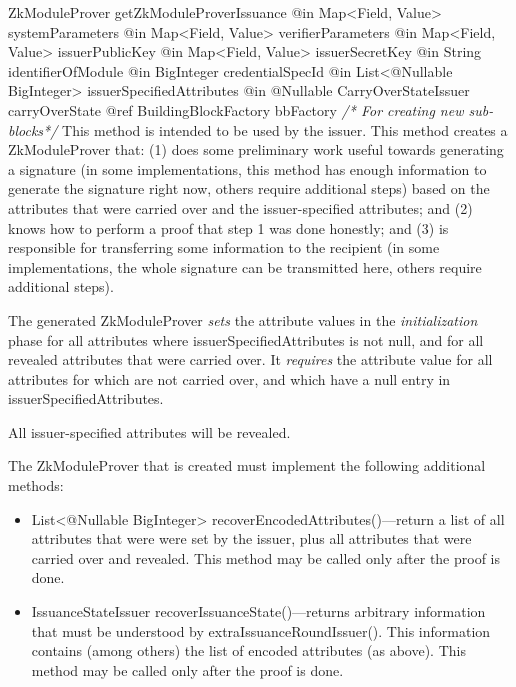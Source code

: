       \begin{method}
      {ZkModuleProver}
      {getZkModuleProverIssuance}
      {
        {@in Map<Field, Value> systemParameters}
        {@in Map<Field, Value> verifierParameters}
        {@in Map<Field, Value> issuerPublicKey}
        {@in Map<Field, Value> issuerSecretKey}
        {@in String identifierOfModule}
        {@in BigInteger credentialSpecId}
        {@in List<@Nullable BigInteger> issuerSpecifiedAttributes}
        {@in @Nullable CarryOverStateIssuer carryOverState}
        {@ref BuildingBlockFactory bbFactory \textrm{\emph{/* For creating new sub-blocks*/}}}
      }
      This method is intended to be used by the issuer.
      This method creates a ZkModuleProver that:
      (1) does some preliminary work useful towards generating a signature (in some implementations, this method has enough information to
      generate the signature right now, others require additional steps) based on the attributes that were carried over and the issuer-specified attributes; and
      (2) knows how to perform a proof
      that step 1 was done honestly;
      and (3) is responsible for transferring some information to the recipient (in some implementations, the whole signature can be transmitted here,
      others require additional steps).

      The generated ZkModuleProver \emph{sets} the attribute values in the \emph{initialization} phase
      for all attributes where issuerSpecifiedAttributes is
      not null, and for all revealed attributes that were carried over.
      It \emph{requires} the attribute value for all attributes for which are not carried over, and which
      have a null entry in issuerSpecifiedAttributes.

      All issuer-specified attributes will be revealed.

      The ZkModuleProver that is created must implement the following additional methods:
        \begin{itemize}
          \item List<@Nullable BigInteger> recoverEncodedAttributes()---return a list of all attributes
          that were were set by the issuer, plus all attributes that were carried over and revealed.
                This method may be called only after the proof is done.
          \item IssuanceStateIssuer recoverIssuanceState()---returns arbitrary information that must be understood
                by extraIssuanceRoundIssuer(). This information contains (among others) the list of encoded attributes (as above).
                This method may be called only after the proof is done.
        \end{itemize}
      \end{method}
